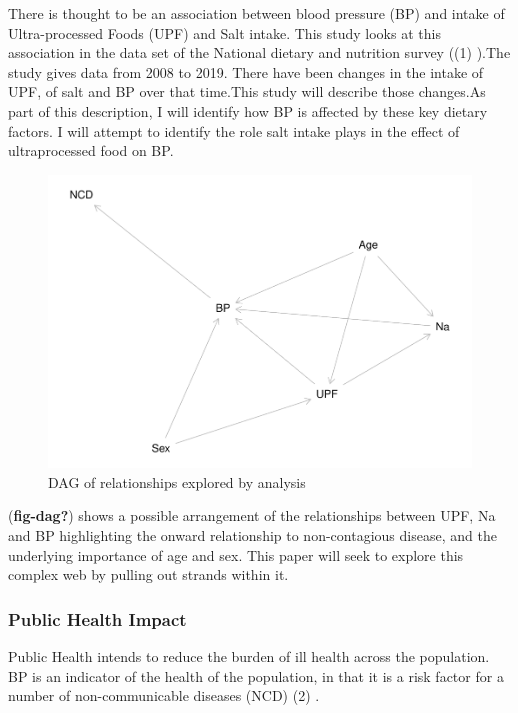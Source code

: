 \documentclass[
]{article}
\begin{document}
There is thought to be an association between blood pressure (BP) and
intake of Ultra-processed Foods (UPF) and Salt intake. This study looks
at this association in the data set of the National dietary and
nutrition survey ((1) ).The study gives data from 2008 to 2019. There
have been changes in the intake of UPF, of salt and BP over that
time.This study will describe those changes.As part of this description,
I will identify how BP is affected by these key dietary factors. I will
attempt to identify the role salt intake plays in the effect of
ultraprocessed food on BP.

\begin{figure}
\centering
\includegraphics{methodandresults_files/figure-latex/fig-dag-1.pdf}
\caption{DAG of relationships explored by analysis}
\end{figure}

(\textbf{fig-dag?}) shows a possible arrangement of the relationships
between UPF, Na and BP highlighting the onward relationship to
non-contagious disease, and the underlying importance of age and sex.
This paper will seek to explore this complex web by pulling out strands
within it.

\hypertarget{public-health-impact}{%
\subsubsection{Public Health Impact}\label{public-health-impact}}

Public Health intends to reduce the burden of ill health across the
population. BP is an indicator of the health of the population, in that
it is a risk factor for a number of non-communicable diseases (NCD) (2)
.
\end{document}
